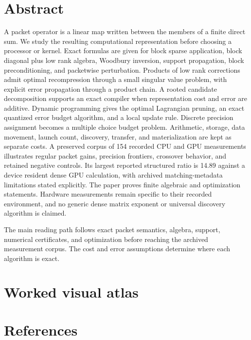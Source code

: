 \documentclass[11pt,letterpaper]{article}
\theoremstyle{definition}
\theoremstyle{remark}
\begin{document}
\section*{Abstract}
A packet operator is a linear map written between the members of a finite direct sum. We study the resulting computational representation before choosing a processor or kernel. Exact formulas are given for block sparse application, block diagonal plus low rank algebra, Woodbury inversion, support propagation, block preconditioning, and packetwise perturbation. Products of low rank corrections admit optimal recompression through a small singular value problem, with explicit error propagation through a product chain. A rooted candidate decomposition supports an exact compiler when representation cost and error are additive. Dynamic programming gives the optimal Lagrangian pruning, an exact quantized error budget algorithm, and a local update rule. Discrete precision assignment becomes a multiple choice budget problem. Arithmetic, storage, data movement, launch count, discovery, transfer, and materialization are kept as separate costs. A preserved corpus of 154 recorded CPU and GPU measurements illustrates regular packet gains, precision frontiers, crossover behavior, and retained negative controls. Its largest reported structured ratio is 14.89 against a device resident dense GPU calculation, with archived matching-metadata limitations stated explicitly. The paper proves finite algebraic and optimization statements. Hardware measurements remain specific to their recorded environment, and no generic dense matrix exponent or universal discovery algorithm is claimed.
\clearpage

\clearpage
\begin{readerroadmap}[title={The finite manuscript}]
The main reading path follows exact packet semantics, algebra, support, numerical certificates, and optimization before reaching the archived measurement corpus. The cost and error assumptions determine where each algorithm is exact.
\end{readerroadmap}

\clearpage\FloatBarrier
\appendix






\clearpage\FloatBarrier
\section*{Worked visual atlas}

\clearpage\FloatBarrier
\section*{References}
\renewcommand{\refname}{}


\end{document}
